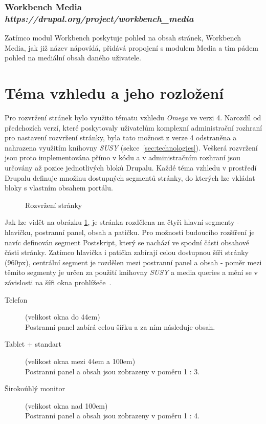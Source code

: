\subsubsection*{Workbench Media \hfill \emph{https://drupal.org/project/workbench\_media}}
Zatímco modul Workbench poskytuje pohled na obsah stránek, Workbench Media, jak již název nápovídá, přidává propojení s modulem Media a tím pádem pohled na mediální obsah daného uživatele. 

\section{Téma vzhledu a jeho rozložení}
Pro rozvržení stránek bylo využito tématu vzhledu \emph{Omega} ve verzi 4. Narozdíl od předchozích verzí, které poskytovaly uživatelům komplexní administrační rozhraní pro nastavení rozvržení stránky, byla tato možnost z verze 4 odstraněna a nahrazena využitím knihovny \emph{SUSY} (sekce~\ref{sec:technologies}). Veškerá rozvržení jsou proto implementována přímo v kódu a v administračním rozhraní jsou určovány až pozice jednotlivých bloků Drupalu. Každé téma vzhledu v prostředí Drupalu definuje množinu dostupných segmentů stránky, do kterých lze vkládat bloky s vlastním obsahem portálu. 

\begin{figure}[htp] 
  \caption{Rozvržení stránky}
  \label{fig:rozvrzeni-stranky}
\end{figure}  

Jak lze vidět na obrázku \ref{fig:rozvrzeni-stranky}, je stránka rozdělena na čtyři hlavní segmenty - hlavičku, postranní panel, obsah a patičku. Pro možnosti budoucího rozšíření je navíc definován segment Postskript, který se nachází ve spodní části obsahové části stránky. Zatímco hlavička i patička zabírají celou dostupnou šíři stránky (960px), centrální segment je rozdělen mezi postranní panel a obsah - poměr mezi těmito segmenty je určen za použití knihovny \emph{SUSY} a media queries a mění se v závislosti na šíři okna prohlížeče~\cite{responsible-drupal}. 

\begin{description}
  \item[Telefon] (velikost okna do 44em) \hfill \\
  Postranní panel zabírá celou šířku a za ním následuje obsah.
  \item[Tablet + standart] (velikost okna mezi 44em a 100em) \hfill \\
  Postranní panel a obsah jsou zobrazeny v poměru 1 : 3.
  \item[Širokoúhlý monitor] (velikost okna nad 100em) \hfill \\
  Postranní panel a obsah jsou zobrazeny v poměru 1 : 4.  
\end{description}

